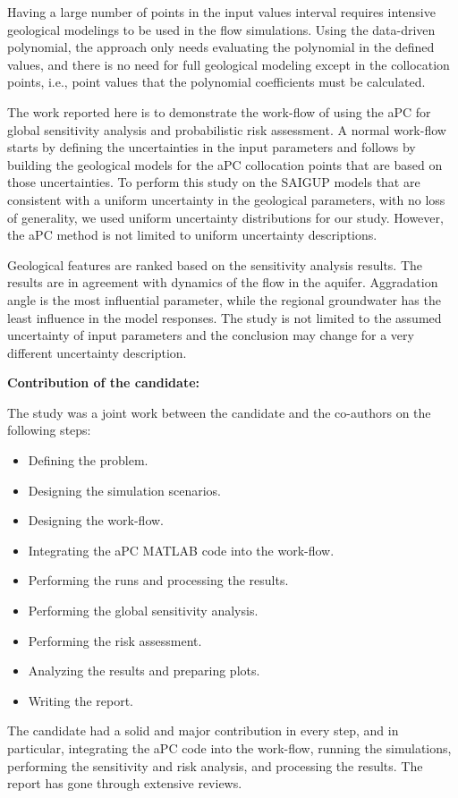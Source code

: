 {Having a large number of points in the input values interval requires
intensive geological modelings to be used in the flow simulations. Using the
data-driven polynomial, the approach only needs evaluating the polynomial in the
defined values, and there is no need for full geological modeling except in
the collocation points, i.e., point values that the polynomial coefficients must
be calculated. 

The work reported here is to demonstrate the work-flow of using the aPC for
global sensitivity analysis and probabilistic risk assessment. A normal
work-flow starts by defining the uncertainties in the input parameters and
follows by building the geological models for the aPC collocation points that are based on those uncertainties.
To perform this study on the SAIGUP models that are consistent
with a uniform uncertainty in the geological parameters, with no loss of
generality, we used uniform uncertainty distributions for our study. However,
the aPC method is not limited to uniform uncertainty descriptions.

Geological features are ranked based on the sensitivity analysis results. The
results are in agreement with dynamics of the flow in the aquifer. Aggradation
angle is the most influential parameter, while the regional groundwater has the
least influence in the model responses. The study is not limited to the assumed
uncertainty of input parameters and the conclusion may change for a very
different uncertainty description. 

\vspace{0.5cm}
\noindent\textbf{Contribution of the candidate:}

The study was a joint work between the candidate and the co-authors on the following steps:

\begin{itemize}
\item Defining the problem.
\item Designing the simulation scenarios.
\item Designing the work-flow.
\item Integrating the aPC MATLAB code into the work-flow.
\item Performing the runs and processing the results.
\item Performing the global sensitivity analysis.
\item Performing the risk assessment.
\item Analyzing the results and preparing plots.
\item Writing the report.
\end{itemize}

The candidate had a solid and major contribution in every step, and in particular, integrating the aPC code into the work-flow, running the simulations, performing the sensitivity and risk analysis, and processing the results. The report has gone through extensive reviews. 
}
